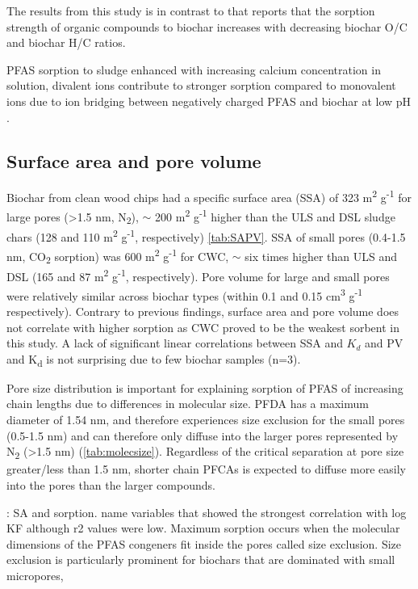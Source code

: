The results from this study is in contrast to \cite{Hale2016} that reports that the sorption strength of organic compounds to biochar increases with decreasing biochar O/C and biochar H/C ratios. 

PFAS sorption to sludge enhanced with increasing calcium concentration in solution, divalent ions contribute to stronger sorption compared to monovalent ions due to ion bridging between negatively charged PFAS and biochar at low pH \citep{zhang2013sorption,arvaniti2014sorption,arvaniti2015review}. 

\subsection{Surface area and pore volume}
Biochar from clean wood chips had a specific surface area (SSA) of 323  m\textsuperscript{2} g\textsuperscript{-1} for large pores (\textgreater 1.5 nm, N\textsubscript{2}), $\sim$ 200 m\textsuperscript{2} g\textsuperscript{-1} higher than the ULS and DSL sludge chars (128 and 110  m\textsuperscript{2} g\textsuperscript{-1}, respectively) \cref{tab:SAPV}. SSA of small pores (0.4-1.5 nm, CO\textsubscript{2} sorption) was 600  m\textsuperscript{2} g\textsuperscript{-1} for CWC, $\sim$ six times higher than ULS and DSL (165 and 87  m\textsuperscript{2} g\textsuperscript{-1}, respectively). Pore volume for large and small pores were relatively similar across biochar types (within 0.1 and 0.15 cm\textsuperscript{3} g\textsuperscript{-1} respectively). Contrary to previous findings, surface area and pore volume does not correlate with higher sorption as CWC proved to be the weakest sorbent in this study. A lack of significant linear correlations between SSA and $K_d$ and PV and K\textsubscript{d} is not surprising due to few biochar samples (n=3). 

Pore size distribution is important for explaining sorption of PFAS of increasing chain lengths due to differences in molecular size. PFDA has a maximum diameter of 1.54 nm, and therefore experiences size exclusion for the small pores (0.5-1.5 nm) and can therefore only diffuse into the larger pores represented by N\textsubscript{2} (\textgreater 1.5 nm) (\cref{tab:molecsize}). Regardless of the critical separation at pore size greater/less than 1.5 nm, shorter chain PFCAs is expected to diffuse more easily into the pores than the larger compounds.  

\citep{Hale2016}: SA and sorption. name variables that showed the strongest correlation with log KF although r2 values were low. Maximum sorption occurs when the molecular dimensions of the PFAS congeners fit inside the pores called size exclusion. Size exclusion is particularly prominent for biochars that are dominated with small micropores, 

